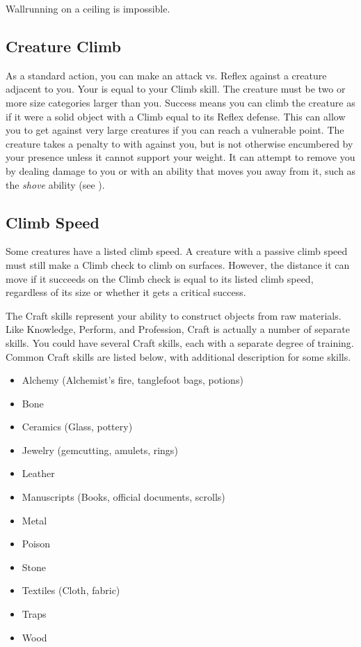         Wallrunning on a ceiling is impossible.

    \subsection{Creature Climb}\label{Creature Climb}
        As a standard action, you can make an attack vs. Reflex against a creature adjacent to you.
        Your  is equal to your Climb skill.
        The creature must be two or more size categories larger than you.
        Success means you can climb the creature as if it were a solid object with a Climb  equal to its Reflex defense.
        This can allow you to get  against very large creatures if you can reach a vulnerable point.
        The creature takes a  penalty to  with  against you, but is not otherwise encumbered by your presence unless it cannot support your weight.
        It can attempt to remove you by dealing damage to you or with an ability that moves you away from it, such as the \textit{shove} ability (see ).

    \subsection{Climb Speed}\label{Climb Speed}
        Some creatures have a listed climb speed.
        A creature with a passive climb speed must still make a Climb check to climb on surfaces.
        However, the distance it can move if it succeeds on the Climb check is equal to its listed climb speed, regardless of its size or whether it gets a critical success.

\newpage
{}
    The Craft skills represent your ability to construct objects from raw materials.
    Like Knowledge, Perform, and Profession, Craft is actually a number of separate skills.
    You could have several Craft skills, each with a separate degree of training.
    Common Craft skills are listed below, with additional description for some skills.

    \begin{itemize}
        \item Alchemy (Alchemist's fire, tanglefoot bags, potions)
        \item Bone
        \item Ceramics (Glass, pottery)
        \item Jewelry (gemcutting, amulets, rings)
        \item Leather
        \item Manuscripts (Books, official documents, scrolls)
        \item Metal
        \item Poison
        \item Stone
        \item Textiles (Cloth, fabric)
        \item Traps
        \item Wood
    \end{itemize}

